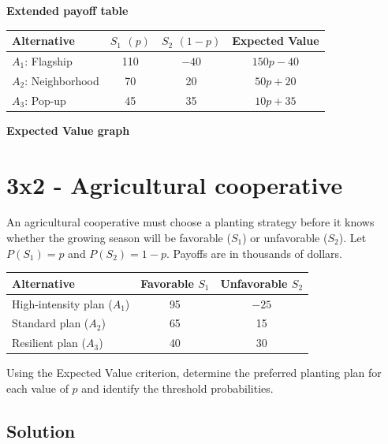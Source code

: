 	\textbf{Extended payoff table}
	\begin{center}
		\renewcommand{\arraystretch}{1.4}
		\begin{tabular}{lccc}
			\toprule
			Alternative & $S_1$ $(p)$ & $S_2$ $(1-p)$ & Expected Value \\
			\midrule
			$A_1$: Flagship & 110 & $-40$ & $150p-40$ \\
			$A_2$: Neighborhood & 70 & 20 & $50p+20$ \\
			$A_3$: Pop-up & 45 & 35 & $10p+35$ \\
			\bottomrule
		\end{tabular}
	\end{center}

	\textbf{Expected Value graph}
	\begin{center}
	\end{center}

	\section{3x2 - Agricultural cooperative}

	An agricultural cooperative must choose a planting strategy before it
	knows whether the growing season will be favorable ($S_1$) or unfavorable
	($S_2$). Let $P(S_1)=p$ and $P(S_2)=1-p$. Payoffs are in thousands of
	dollars.

	\begin{center}
		\renewcommand{\arraystretch}{1.3}
		\begin{tabular}{lcc}
			\toprule
			Alternative & Favorable $S_1$ & Unfavorable $S_2$ \\
			\midrule
			High-intensity plan ($A_1$) & 95 & $-25$ \\
			Standard plan ($A_2$) & 65 & 15 \\
			Resilient plan ($A_3$) & 40 & 30 \\
			\bottomrule
		\end{tabular}
	\end{center}

	Using the Expected Value criterion, determine the preferred planting plan
	for each value of $p$ and identify the threshold probabilities.

	\subsection{Solution}

